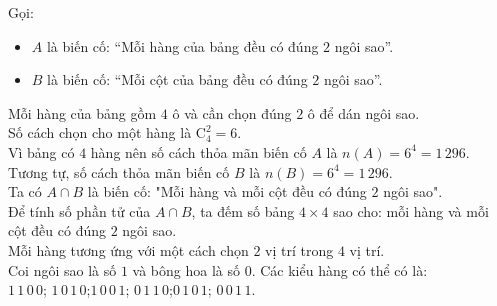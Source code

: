 \begin{ex}%
	\loigiai
	{
	Gọi:
	\begin{itemize}
	\item $A$ là biến cố: “Mỗi hàng của bảng đều có đúng $2$ ngôi sao”.
	\item $B$ là biến cố: “Mỗi cột của bảng đều có đúng $2$ ngôi sao”.	
	\end{itemize}
	Mỗi hàng của bảng gồm $4$ ô và cần chọn đúng $2$ ô để dán ngôi sao.\\
	Số cách chọn cho một hàng là $\mathrm{C}_4^2=6$.\\
	Vì bảng có $4$ hàng nên số cách thỏa mãn biến cố $A$ là $n(A)=6^4=1\,296$.\\
	Tương tự, số cách thỏa mãn biến cố $B$ là $n(B)=6^4=1\,296$.\\
	Ta có $A\cap B$ là biến cố: 
	"Mỗi hàng và mỗi cột đều có đúng $2$ ngôi sao".\\
	Để tính số phần tử của $A\cap B$, ta đếm số bảng $4\times4$ sao cho: mỗi hàng và mỗi cột đều có đúng $2$ ngôi sao.\\
	Mỗi hàng tương ứng với một cách chọn $2$ vị trí trong $4$ vị trí.\\
	Coi ngôi sao là số $1$ và bông hoa là số $0$. Các kiểu hàng có thể có là: \\
	$1\,1\,0\,0$; \quad $1\,0\,1\,0$;\quad $1\,0\,0\,1$; \quad $0\,1\,1\,0$;\quad $0\,1\,0\,1$; \quad$0\,0\,1\,1$.\\
}
\end{ex}
